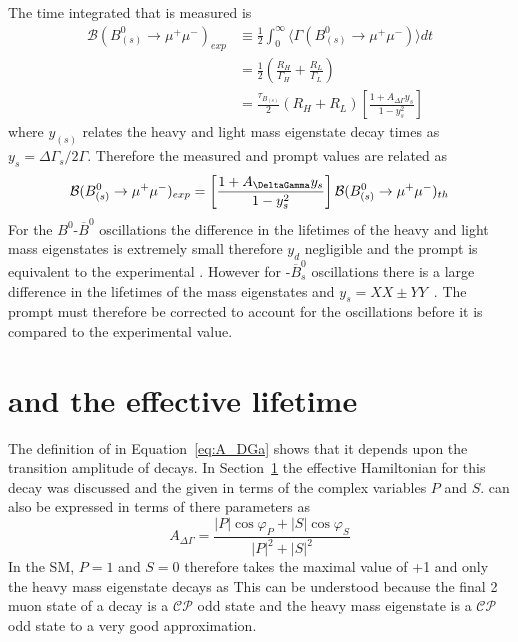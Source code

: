 The time integrated \BF that is measured is
\begin{align}
  \mathcal{B}(B^{0}_{(s)} \to \mu^{+}\mu^{-})_{exp} &\equiv \frac{1}{2} \int^{\infty}_0 \langle \Gamma (B^{0}_{(s)} \to \mu^{+}\mu^{-}) \rangle  dt \nonumber \\
&= \frac{1}{2} \left( \frac{R_{H}}{\Gamma_{H}} + \frac{R_{L}}{\Gamma_{L}} \right) \nonumber \\
&= \frac{\tau_{B_{(s)}}}{2}(R_{H} + R_{L}) \left[ \frac{1 + A_{\Delta\Gamma}y_{s}}{1 - y_{s}^{2}} \right]
\end{align}
where $y_{(s)}$ relates the heavy and light mass eigenstate decay times as $y_s = \Delta \Gamma_s / 2\Gamma$. Therefore the measured and prompt \BF values are related as
\begin{equation}
  \mathcal{B}(B^0_{(s)} \to \mu^+\mu^-)_{exp} = \left[ \frac{1 + A_{\DeltaGamma}y_{s}}{1 - y_{s}^{2}} \right] \mathcal{B}(B^0_{(s)} \to \mu^+ \mu^-)_{th}
\end{equation}
For the $B^0$-$\overline{B}^0$ oscillations the difference in the lifetimes of the heavy and light mass eigenstates is extremely small therefore $y_d$ negligible and the prompt \BF is equivalent to the experimental \BF. However for \bs-$\overline{B}^0_s$ oscillations there is a large difference in the lifetimes of the mass eigenstates and $y_s =XX \pm YY$~\cite{}. The prompt \BF must therefore be corrected to account for the oscillations before it is compared to the experimental value.
\section{\ADG and the effective lifetime}
The definition of \ADG in Equation~\ref{eq:A_DGa} shows that it depends upon the transition amplitude of \bsmumu decays. In Section~\ref{} the effective Hamiltonian for this decay was discussed and the \BF given in terms of the complex variables $P$ and $S$. \ADG can also be expressed in terms of there parameters as~\cite{}
\begin{equation}
A_{\Delta \Gamma} = \frac{|P|\cos \varphi_P + |S| \cos \varphi_S}{|P|^2 + |S|^2}
\label{eq:NP_ADG}
\end{equation}
In the SM, $P=1$ and $S=0$ therefore \ADG takes the maximal value of +1 and only the heavy mass eigenstate decays as \bsmumu This can be understood because the final 2 muon state of a \bsmumu decay is a $\mathcal{CP}$ odd state and the heavy \bs mass eigenstate is a $\mathcal{CP}$ odd state to a very good approximation.

